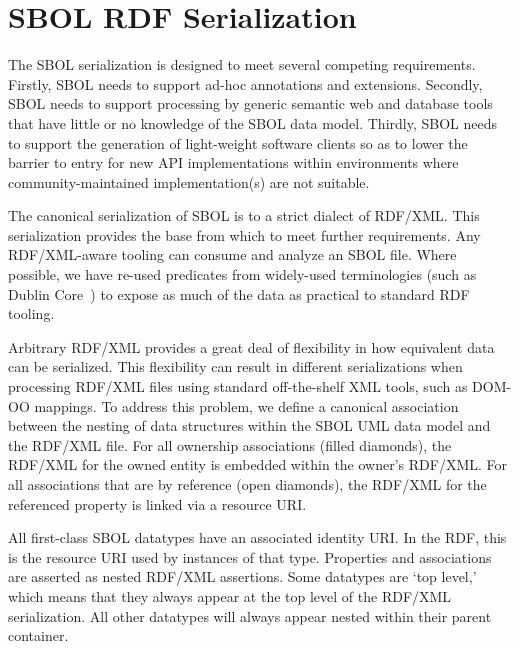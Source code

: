 \section{SBOL RDF Serialization}
\label{sec:serialization}


The SBOL serialization is designed to meet several competing requirements. Firstly, SBOL needs to support ad-hoc annotations and extensions. Secondly, SBOL needs to support processing by generic semantic web and database tools that have little or no knowledge of the SBOL data model. Thirdly, SBOL needs to support the generation of light-weight software clients so as to lower the barrier to entry for new API implementations within environments where community-maintained implementation(s) are not suitable.

The canonical serialization of SBOL is to a strict dialect of RDF/XML. This serialization provides the base from which to meet further requirements. Any RDF/XML-aware tooling can consume and analyze an SBOL file. Where possible, we have re-used predicates from widely-used terminologies (such as Dublin Core~\cite{dcmi2012}) to expose as much of the data as practical to standard RDF tooling.

Arbitrary RDF/XML provides a great deal of flexibility in how equivalent data can be serialized. This flexibility can result in different serializations when processing RDF/XML files using standard off-the-shelf XML tools, such as DOM-OO mappings. To address this problem, we define a canonical association between the nesting of data structures within the SBOL UML data model and the RDF/XML file. For all ownership associations (filled diamonds), the RDF/XML for the owned entity is embedded within the owner's RDF/XML. For all associations that are by reference (open diamonds), the RDF/XML for the referenced property is linked via a resource URI.

All first-class SBOL datatypes have an associated identity URI. In the RDF, this is the resource URI used by instances of that type. Properties and associations are asserted as nested RDF/XML assertions. Some datatypes are `top level,' which means that they always appear at the top level of the RDF/XML serialization. All other datatypes will always appear nested within their parent container.

